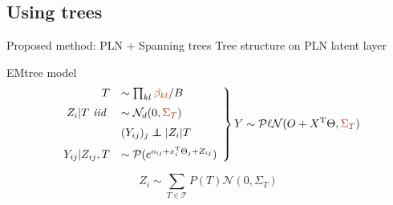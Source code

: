 \documentclass[11pt]{beamer}
\newcommand{\emphase}[1]{\textcolor{Complement}{#1}}
\newcommand\independent{\protect\mathpalette{\protect\independenT}{\perp}}\def\independenT#1#2{\mathrel{\rlap{$#1#2$}\mkern2mu{#1#2}}}
\begin{document}
\subsection{Using trees}
\begin{frame}{Proposed method: PLN + Spanning trees }
Tree structure on PLN latent layer \bigskip
 \begin{block}{EMtree model}
\[
            \left.
                \begin{array}{rl}
                	 \vspace{0.2cm} 						T & \sim \prod_{kl} \emphase{\beta_{kl}} /B\\ 
               \vspace{0.2cm}    Z_i | T \textit{ iid } &\sim \mathcal{N}_{d}(0,\emphase{\Sigma_T})\\
              \vspace{0.2cm}    &(Y_{ij})_j \independent |Z_i| T\\
                    Y_{ij}|Z_{ij},T &\sim \mathcal{P}( e^{o_{ij}+x_i^{\text{T}}\Theta_j+Z_{ij}}) 
                   
                \end{array}
            \right \} Y \sim \mathcal{P\ell N}(O+X^{\text{T}}\Theta, \emphase{\Sigma_T})  
            \]
\end{block}

$$Z_i \sim \sum_{T\in \mathcal{T}} P(T) \mathcal{N}(0,\Sigma_T)$$
  \end{frame}
\end{document}
